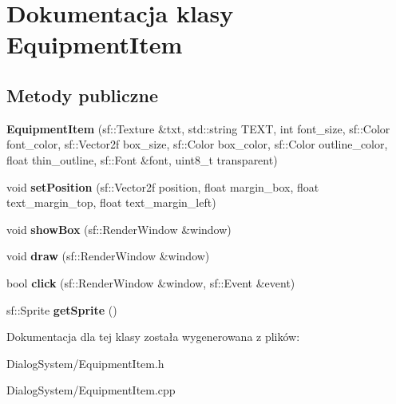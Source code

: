 \hypertarget{class_equipment_item}{\section{Dokumentacja klasy Equipment\-Item}
\label{class_equipment_item}
}
\subsection*{Metody publiczne}
\begin{DoxyCompactItemize}
\item 
\hypertarget{class_equipment_item_a507d9df3d88123f1dec109899763f383}{{\bfseries Equipment\-Item} (sf\-::\-Texture \&txt, std\-::string T\-E\-X\-T, int font\-\_\-size, sf\-::\-Color font\-\_\-color, sf\-::\-Vector2f box\-\_\-size, sf\-::\-Color box\-\_\-color, sf\-::\-Color outline\-\_\-color, float thin\-\_\-outline, sf\-::\-Font \&font, uint8\-\_\-t transparent)}\label{class_equipment_item_a507d9df3d88123f1dec109899763f383}

\item 
\hypertarget{class_equipment_item_a2d3ecb4dbfa1203667f23d20ce0a9079}{void {\bfseries set\-Position} (sf\-::\-Vector2f position, float margin\-\_\-box, float text\-\_\-margin\-\_\-top, float text\-\_\-margin\-\_\-left)}\label{class_equipment_item_a2d3ecb4dbfa1203667f23d20ce0a9079}

\item 
\hypertarget{class_equipment_item_a296ad994b66b1030a785d25db6d6de88}{void {\bfseries show\-Box} (sf\-::\-Render\-Window \&window)}\label{class_equipment_item_a296ad994b66b1030a785d25db6d6de88}

\item 
\hypertarget{class_equipment_item_a672338412d6a25355d207365463fdbfb}{void {\bfseries draw} (sf\-::\-Render\-Window \&window)}\label{class_equipment_item_a672338412d6a25355d207365463fdbfb}

\item 
\hypertarget{class_equipment_item_a272b4fbf364401f4da062989fd378279}{bool {\bfseries click} (sf\-::\-Render\-Window \&window, sf\-::\-Event \&event)}\label{class_equipment_item_a272b4fbf364401f4da062989fd378279}

\item 
\hypertarget{class_equipment_item_a0bfae8fad4d05892cf8409b505421617}{sf\-::\-Sprite {\bfseries get\-Sprite} ()}\label{class_equipment_item_a0bfae8fad4d05892cf8409b505421617}

\end{DoxyCompactItemize}


Dokumentacja dla tej klasy została wygenerowana z plików\-:\begin{DoxyCompactItemize}
\item 
Dialog\-System/Equipment\-Item.\-h\item 
Dialog\-System/Equipment\-Item.\-cpp\end{DoxyCompactItemize}

